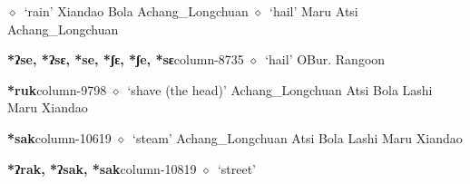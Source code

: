 \hspace{1ex}
         $\diamond$~`rain'
         Xiandao 
\hspace{1ex}
         Bola 
\hspace{1ex}
         Achang\_Longchuan 
\hspace{1ex}
         $\diamond$~`hail'
         Maru 
\hspace{1ex}
         Atsi 
\hspace{1ex}
         Achang\_Longchuan 
  \item {\footnotesize \textbf{*ʔse, *ʔsɛ, *se, *ʃɛ, *ʃe, *sɛ}}{\tiny column-8735}
         $\diamond$~`hail'
         OBur. 
\hspace{1ex}
         Rangoon 
  \item {\footnotesize \textbf{*ruk}}{\tiny column-9798}
         $\diamond$~`shave (the head)'
         Achang\_Longchuan 
\hspace{1ex}
         Atsi 
\hspace{1ex}
         Bola 
\hspace{1ex}
         Lashi 
\hspace{1ex}
         Maru 
\hspace{1ex}
         Xiandao 
  \item {\footnotesize \textbf{*sak}}{\tiny column-10619}
         $\diamond$~`steam'
         Achang\_Longchuan 
\hspace{1ex}
         Atsi 
\hspace{1ex}
         Bola 
\hspace{1ex}
         Lashi 
\hspace{1ex}
         Maru 
\hspace{1ex}
         Xiandao 
  \item {\footnotesize \textbf{*ʔrak, *ʔsak, *sak}}{\tiny column-10819}
         $\diamond$~`street'
